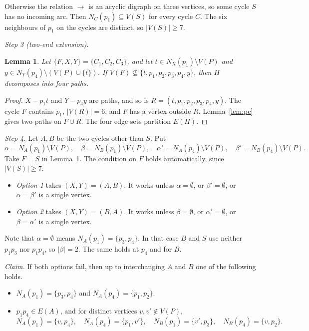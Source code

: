 \documentclass[11pt]{amsart}
\newtheorem{lemma}[theorem]{Lemma}
\theoremstyle{definition}
\theoremstyle{remark}
\begin{document}
Otherwise the relation $\to$ is an acyclic digraph on three vertices, so some cycle $S$ has no
incoming arc. Then $N_C(p_1)\subseteq V(S)$ for every cycle $C$. The six neighbours of $p_1$ on the
cycles are distinct, so $|V(S)|\ge 7$.

\emph{Step 3 (two-end extension).}
\begin{lemma}\label{lem:two}
Let $\{F,X,Y\}=\{C_1,C_2,C_3\}$, and let $t\in N_X(p_1)\setminus V(P)$ and
$y\in N_Y(p_4)\setminus(V(P)\cup\{t\})$. If $V(F)\not\subseteq\{t,p_1,p_2,p_3,p_4,y\}$, then
$H$ decomposes into four paths.
\end{lemma}
\begin{proof}
$X-p_1t$ and $Y-p_4y$ are paths, and so is $R=(t,p_1,p_2,p_3,p_4,y)$. The cycle $F$ contains $p_1$,
$|V(R)|=6$, and $F$ has a vertex outside $R$. Lemma~\ref{lem:pc} gives two paths on $F\cup R$. The
four edge sets partition $E(H)$.
\end{proof}

\emph{Step 4.} Let $A,B$ be the two cycles other than $S$. Put
$$\alpha=N_A(p_1)\setminus V(P),\quad \beta=N_B(p_1)\setminus V(P),\quad
\alpha'=N_A(p_4)\setminus V(P),\quad \beta'=N_B(p_4)\setminus V(P).$$
Take $F=S$ in Lemma~\ref{lem:two}. The condition on $F$ holds automatically, since $|V(S)|\ge 7$.
\begin{itemize}[leftmargin=*]
\item \emph{Option 1} takes $(X,Y)=(A,B)$. It works unless $\alpha=\emptyset$, or $\beta'=\emptyset$,
or $\alpha=\beta'$ is a single vertex.
\item \emph{Option 2} takes $(X,Y)=(B,A)$. It works unless $\beta=\emptyset$, or $\alpha'=\emptyset$, or
$\beta=\alpha'$ is a single vertex.
\end{itemize}
Note that $\alpha=\emptyset$ means $N_A(p_1)=\{p_3,p_4\}$. In that case $B$ and $S$ use neither
$p_1p_3$ nor $p_1p_4$, so $|\beta|=2$. The same holds at $p_4$ and for $B$.

\emph{Claim.} If both options fail, then up to interchanging $A$ and $B$ one of the following
holds.
\begin{itemize}[leftmargin=*]
\item[(F1)] $N_A(p_1)=\{p_3,p_4\}$ and $N_A(p_4)=\{p_1,p_2\}$.
\item[(F3)] $p_1p_4\in E(A)$, and for distinct vertices $v,v'\notin V(P)$,
$$N_A(p_1)=\{v,p_4\},\quad N_A(p_4)=\{p_1,v'\},\quad N_B(p_1)=\{v',p_3\},\quad N_B(p_4)=\{v,p_2\}.$$
\end{itemize}
\end{document}
